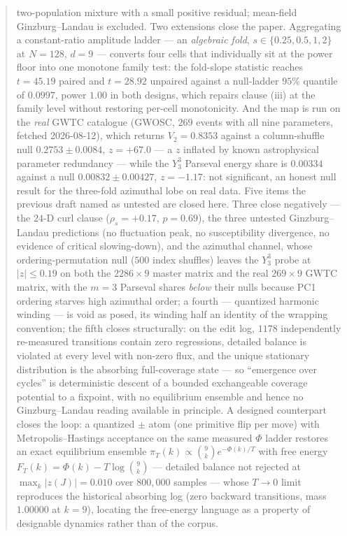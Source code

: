 \documentclass[11pt,a4paper]{article}
\theoremstyle{plain}
\theoremstyle{remark}
\theoremstyle{plain}
\begin{document}
\begin{abstract}
two-population mixture with a small positive residual; mean-field Ginzburg--Landau is excluded. Two extensions close the paper. Aggregating a constant-ratio amplitude ladder --- an \emph{algebraic fold}, $s\in\{0.25,0.5,1,2\}$ at $N=128$, $d=9$ --- converts four cells that individually sit at the power floor into one monotone family test: the fold-slope statistic reaches $t=45.19$ paired and $t=28.92$ unpaired against a null-ladder $95\%$ quantile of $0.0997$, power $1.00$ in both designs, which repairs clause (iii) at the family level without restoring per-cell monotonicity. And the map is run on the \emph{real} GWTC catalogue (GWOSC, $269$ events with all nine parameters, fetched 2026-08-12), which returns $V_2=0.8353$ against a column-shuffle null $0.2753\pm0.0084$, $z=+67.0$ --- a $z$ inflated by known astrophysical parameter redundancy --- while the $Y_3^3$ Parseval energy share is $0.00334$ against a null $0.00832\pm0.00427$, $z=-1.17$: not significant, an honest null result for the three-fold azimuthal lobe on real data. Five items the previous draft named as untested are closed here. Three close negatively --- the $24$-D curl clause ($\rho_s=+0.17$, $p=0.69$), the three untested Ginzburg--Landau predictions (no fluctuation peak, no susceptibility divergence, no evidence of critical slowing-down), and the azimuthal channel, whose ordering-permutation null ($500$ index shuffles) leaves the $Y_3^3$ probe at $|z|\le0.19$ on both the $2286\times9$ master matrix and the real $269\times9$ GWTC matrix, with the $m{=}3$ Parseval shares \emph{below} their nulls because PC1 ordering starves high azimuthal order; a fourth --- quantized harmonic winding --- is void as posed, its winding half an identity of the wrapping convention; the fifth closes structurally: on the edit log, $1178$ independently re-measured transitions contain zero regressions, detailed balance is violated at every level with non-zero flux, and the unique stationary distribution is the absorbing full-coverage state --- so ``emergence over cycles'' is deterministic descent of a bounded exchangeable coverage potential to a fixpoint, with no equilibrium ensemble and hence no Ginzburg--Landau reading available in principle. A designed counterpart closes the loop: a quantized $\pm$ atom (one primitive flip per move) with Metropolis--Hastings acceptance on the same measured $\Phi$ ladder restores an exact equilibrium ensemble $\pi_T(k)\propto\binom{9}{k}e^{-\Phi(k)/T}$ with free energy $F_T(k)=\Phi(k)-T\log\binom{9}{k}$ --- detailed balance not rejected at $\max_k|z(J)|=0.010$ over $800{,}000$ samples --- whose $T\to0$ limit reproduces the historical absorbing log (zero backward transitions, mass $1.00000$ at $k=9$), locating the free-energy language as a property of designable dynamics rather than of the corpus.
\end{abstract}
\end{document}
